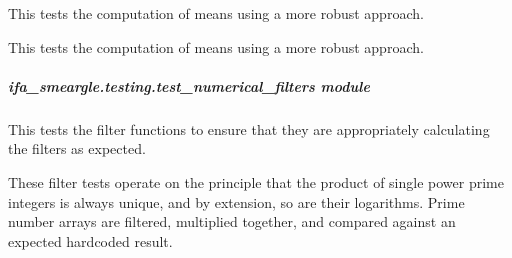 \documentclass[letterpaper,10pt,english]{sphinxmanual}
\begin{document}
\begin{fulllineitems}
\label{\detokenize{docstrings/ifa_smeargle.testing.test_numerical_core_mathematics:ifa_smeargle.testing.test_numerical_core_mathematics.test_ifas_robust_mean}}
This tests the computation of means using a more robust
approach.

\end{fulllineitems}


\begin{fulllineitems}
\label{\detokenize{docstrings/ifa_smeargle.testing.test_numerical_core_mathematics:ifa_smeargle.testing.test_numerical_core_mathematics.test_ifas_robust_std}}
This tests the computation of means using a more robust
approach.

\end{fulllineitems}



\subparagraph{ifa\_smeargle.testing.test\_numerical\_filters module}
\label{\detokenize{docstrings/ifa_smeargle.testing.test_numerical_filters:module-ifa_smeargle.testing.test_numerical_filters}}\label{\detokenize{docstrings/ifa_smeargle.testing.test_numerical_filters:ifa-smeargle-testing-test-numerical-filters-module}}\label{\detokenize{docstrings/ifa_smeargle.testing.test_numerical_filters::doc}}
This tests the filter functions to ensure that they are
appropriately calculating the filters as expected.

These filter tests operate on the principle that the product of
single power prime integers is always unique, and by extension,
so are their logarithms. Prime number arrays are filtered,
multiplied together, and compared against an expected hard\sphinxhyphen{}coded
result.
\end{document}
